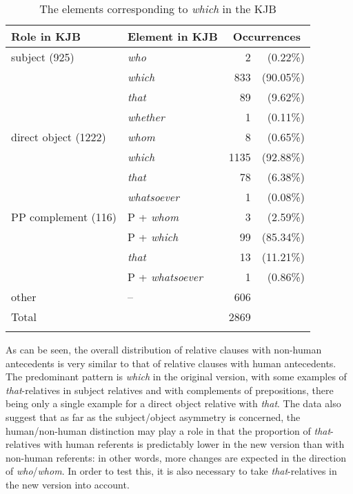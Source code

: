 \begin{table}
\begin{tabular}{ll r@{~}r}
\lsptoprule
Role in KJB & Element in KJB & \multicolumn{2}{c}{Occurrences}\\\midrule
{subject (925)} & \textit{who}     & {2}   &  (0.22\%)\\
                    {} & \textit{which}   & {833} & (90.05\%)\\
                    {} & \textit{that}    & {89}  &  (9.62\%)\\
                    {} & \textit{whether} & {1}   &  (0.11\%)\\
\addlinespace
{direct object (1222)} & \textit{whom}       & {8}    &  (0.65\%)\\
{}                            & \textit{which}      & {1135} & (92.88\%)\\
{}                            & \textit{that}       & {78}   &  (6.38\%)\\
{}                            & \textit{whatsoever} & {1}    &  (0.08\%)\\
\addlinespace
{PP complement (116)} & P + \textit{whom}       & {3}  &  (2.59\%)\\
                          {} & P + \textit{which}      & {99} &  (85.34\%)\\
                          {} & \textit{that}           & {13} &  (11.21\%)\\
                          {} & P + \textit{whatsoever} & {1}  &  (0.86\%)\\
\addlinespace
other & -- & 606 & \\
\midrule
Total & & 2869 &\\
\lspbottomrule
\end{tabular}
\caption{The elements corresponding to \textit{which} in the KJB}
\label{tablekjwhich}
\end{table}

As can be seen, the overall distribution of relative clauses with non-human antecedents is very similar to that of relative clauses with human antecedents. The predominant pattern is \textit{which} in the original version, with some examples of \textit{that}-relatives in subject relatives and with complements of prepositions, there being only a single example for a direct object relative with \textit{that}. The data also suggest that as far as the subject/object asymmetry is concerned, the human/non-human distinction may play a role in that the proportion of \textit{that}-relatives with human referents is predictably lower in the new version than with non-human referents: in other words, more changes are expected in the direction of \textit{who}/\textit{whom}. In order to test this, it is also necessary to take \textit{that}-relatives in the new version into account.

